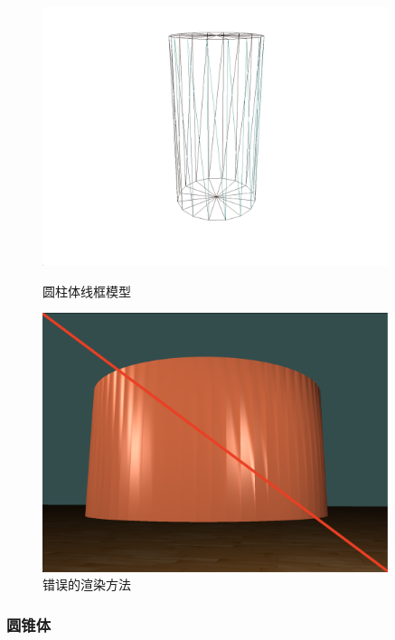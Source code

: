 \documentclass[math-font=newcm]{sjtuarticle}
\begin{document}
\begin{figure}[h]
    \begin{minipage}{0.45\textwidth}
        \centering
        \includegraphics[width=0.9\textwidth]{cylinder.png}
        \caption{圆柱体线框模型}
        \label{fig:cylinder}
    \end{minipage}
    \begin{minipage}{0.45\textwidth}
        \centering
        \includegraphics[width=0.9\textwidth]{wrongcy.png}
        \caption{错误的渲染方法}
        \label{fig:wrongcy}
    \end{minipage}
\end{figure}

\subsubsection{圆锥体}
\end{document}
